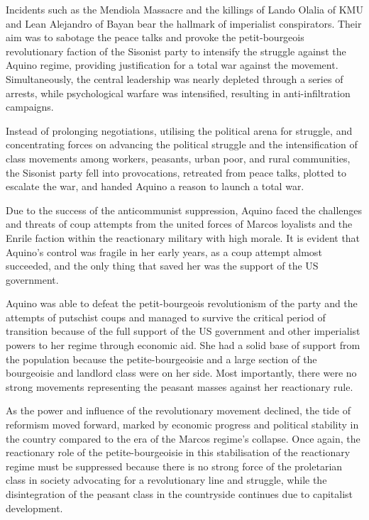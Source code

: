 Incidents such as the Mendiola Massacre and the killings of Lando Olalia of KMU 
and Lean Alejandro of Bayan bear the hallmark of imperialist conspirators. 
Their aim was to sabotage the peace talks 
and provoke the petit-bourgeois revolutionary faction of the Sisonist party 
to intensify the struggle against the Aquino regime, 
providing justification for a total war against the movement. 
Simultaneously, the central leadership was nearly depleted 
through a series of arrests, while psychological warfare was intensified, 
resulting in anti-infiltration campaigns.

Instead of prolonging negotiations, utilising the political arena for struggle, 
and concentrating forces on advancing the political struggle 
and the intensification of class movements 
among workers, peasants, urban poor, and rural communities, 
the Sisonist party fell into provocations, retreated from peace talks, 
plotted to escalate the war, and handed Aquino a reason to launch a total war.

Due to the success of the anticommunist suppression, 
Aquino faced the challenges and threats of coup attempts 
from the united forces of Marcos loyalists 
and the Enrile faction within the reactionary military with high morale. 
It is evident that Aquino's control was fragile in her early years, 
as a coup attempt almost succeeded, 
and the only thing that saved 
her was the support of the US government.

Aquino was able to defeat the petit-bourgeois revolutionism of the party 
and the attempts of putschist coups 
and managed to survive the critical period of transition 
because of the full support of the US government 
and other imperialist powers to her regime through economic aid. 
She had a solid base of support from the population 
because the petite-bourgeoisie 
and a large section of the bourgeoisie 
and landlord class were on her side. 
Most importantly, 
there were no strong movements representing the peasant masses 
against her reactionary rule.

As the power and influence of the revolutionary movement declined, 
the tide of reformism moved forward, 
marked by economic progress and political stability in the country 
compared to the era of the Marcos regime's collapse. 
Once again, the reactionary role of the petite-bourgeoisie 
in this stabilisation of the reactionary regime 
must be suppressed 
because there is no strong force of the proletarian class 
in society advocating for a revolutionary line and struggle, 
while the disintegration of the peasant class 
in the countryside continues due to capitalist development.


